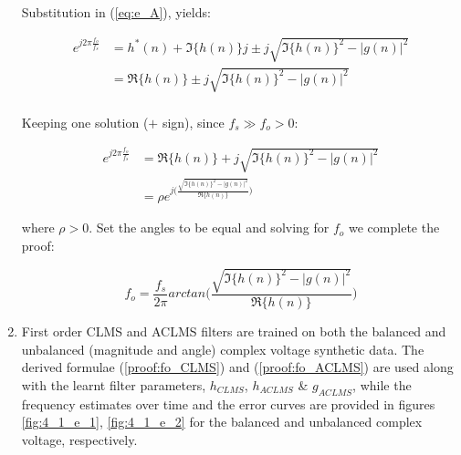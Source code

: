 \begin{enumerate}[label=\alph*), leftmargin=*]
Substitution in (\ref{eq:e_A}), yields:

\begin{align}
    e^{j 2\pi \frac{f_{o}}{f_{s}}}  &= h^{*}(n) + \Im\{h(n)\}j \pm j\sqrt{\Im\{h(n)\}^{2} - |g(n)|^{2}} \\
                                    &= \Re\{h(n)\} \pm j\sqrt{\Im\{h(n)\}^{2} - |g(n)|^{2}} \\
\end{align}

Keeping one solution ($+$ sign), since $f_{s} \gg f_{o} > 0$:

\begin{align}
    e^{j 2\pi \frac{f_{o}}{f_{s}}}  &= \Re\{h(n)\} + j\sqrt{\Im\{h(n)\}^{2} - |g(n)|^{2}} \\
                                    &= \rho e^{j\big(\frac{\sqrt{\Im\{h(n)\}^{2} - |g(n)|^{2}}}{\Re\{h(n)\}}\big)}
\end{align}

where $\rho > 0$. Set the angles to be equal and solving for $f_{o}$ we complete the proof:

\begin{equation}
    f_{o} = \frac{f_{s}}{2 \pi} arctan \bigg(\frac{\sqrt{\Im\{h(n)\}^{2} - |g(n)|^{2}}}{\Re\{h(n)\}}\bigg)
\label{proof:fo_ACLMS}
\end{equation}

\item
%

First order CLMS and ACLMS filters are trained on both the balanced and unbalanced (magnitude and angle) complex voltage synthetic data.
The derived formulae (\ref{proof:fo_CLMS}) and (\ref{proof:fo_ACLMS}) are used along with the learnt filter parameters, $h_{CLMS}$, $h_{ACLMS}$ \& $g_{ACLMS}$,
while the frequency estimates over time and the error curves are provided in figures \ref{fig:4_1_e_1}, \ref{fig:4_1_e_2} for the balanced and unbalanced complex voltage, respectively.


\end{enumerate}

